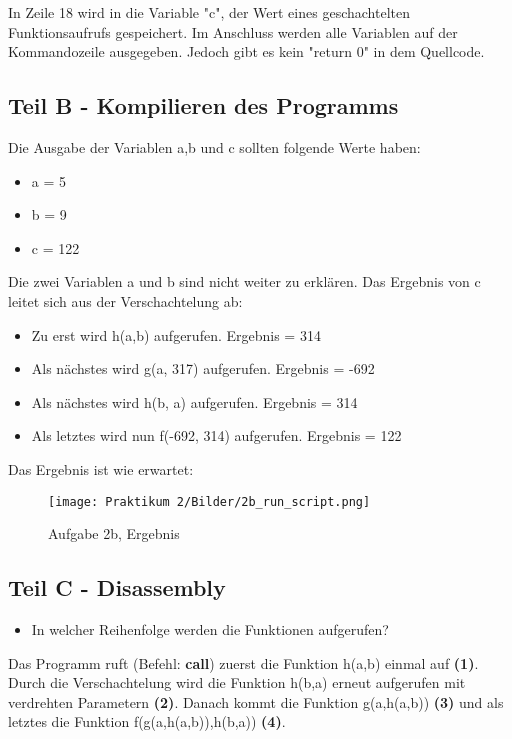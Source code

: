 \documentclass[12pt]{article}
\begin{document}
In Zeile 18 wird in die Variable "c", der Wert eines geschachtelten Funktionsaufrufs gespeichert. Im Anschluss werden alle Variablen auf der Kommandozeile ausgegeben. Jedoch gibt es kein "return 0" in dem Quellcode.
\newpage

\subsection{Teil B - Kompilieren des Programms}

Die Ausgabe der Variablen a,b und c sollten folgende Werte haben:

\begin{itemize}
  \item a = 5
  \item b = 9
  \item c = 122
\end{itemize}
Die zwei Variablen a und b sind nicht weiter zu erklären. Das Ergebnis von c leitet sich aus der Verschachtelung ab:

\begin{itemize}
  \item Zu erst wird h(a,b) aufgerufen. Ergebnis = 314
  \item Als nächstes wird g(a, 317) aufgerufen. Ergebnis = -692
  \item Als nächstes wird h(b, a) aufgerufen. Ergebnis = 314
  \item Als letztes wird nun f(-692, 314) aufgerufen. Ergebnis = 122
\end{itemize}

Das Ergebnis ist wie erwartet:

\begin{figure}[htbp]
    \centering
    \texttt{[image: Praktikum 2/Bilder/2b\_run\_script.png]}
    \caption{Aufgabe 2b, Ergebnis}
\end{figure}
\newpage

\subsection{Teil C - Disassembly}

\begin{itemize}
  \item In welcher Reihenfolge werden die Funktionen aufgerufen?
  \end{itemize}
  Das Programm ruft (Befehl: \textbf{call}) zuerst die Funktion h(a,b) einmal auf \textbf{(1)}. Durch die Verschachtelung wird die Funktion h(b,a) erneut aufgerufen mit verdrehten Parametern \textbf{(2)}. Danach kommt die Funktion g(a,h(a,b)) \textbf{(3)} und als letztes die Funktion f(g(a,h(a,b)),h(b,a)) \textbf{(4)}.
  
\end{document}
